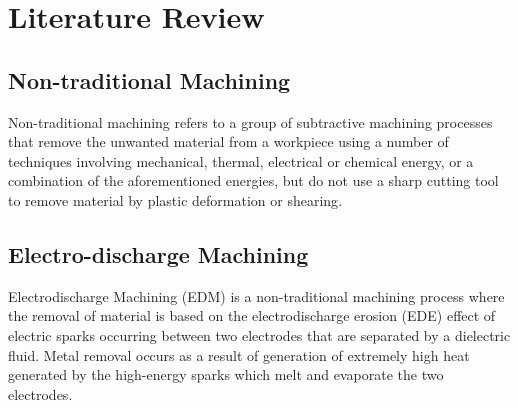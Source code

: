 \chapter{Literature Review}
\lhead{\leftmark}
\label{sec:review}
%
\section{Non-traditional Machining}
Non-traditional machining refers to a group of subtractive machining processes that remove the unwanted material from a workpiece using a number of techniques involving mechanical, thermal, electrical or chemical energy, or a combination of the aforementioned energies, but do not use a sharp cutting tool to remove material by plastic deformation or shearing\cite{classnotes}.

\section{Electro-discharge Machining}
Electrodischarge Machining (EDM) is a non-traditional machining process where the removal of material is based on the electrodischarge erosion (EDE) effect of electric sparks occurring between two electrodes that are separated by a dielectric fluid. Metal removal occurs as a result of generation of extremely high heat generated by the high-energy sparks which melt and evaporate the two electrodes.
